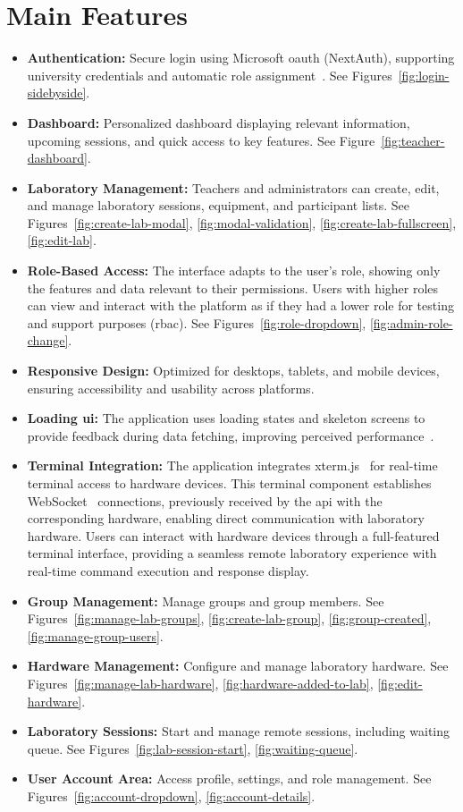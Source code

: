 \section{Main Features}
\begin{itemize}
    \item \textbf{Authentication:} Secure login using Microsoft \ac{oauth} (NextAuth), supporting university credentials and automatic role assignment~\cite{nextjs-authentication}. See Figures~\ref{fig:login-sidebyside}.
    \item \textbf{Dashboard:} Personalized dashboard displaying relevant information, upcoming sessions, and quick access to key features. See Figure~\ref{fig:teacher-dashboard}.
    \item \textbf{Laboratory Management:} Teachers and administrators can create, edit, and manage laboratory sessions, equipment, and participant lists. See Figures~\ref{fig:create-lab-modal}, \ref{fig:modal-validation}, \ref{fig:create-lab-fullscreen}, \ref{fig:edit-lab}.
    \item \textbf{Role-Based Access:} The interface adapts to the user's role, showing only the features and data relevant to their permissions. Users with higher roles can view and interact with the platform as if they had a lower role for testing and support purposes (\ac{rbac}). See Figures~\ref{fig:role-dropdown}, \ref{fig:admin-role-change}.
    \item \textbf{Responsive Design:} Optimized for desktops, tablets, and mobile devices, ensuring accessibility and usability across platforms.
    \item \textbf{Loading \ac{ui}:} The application uses loading states and skeleton screens to provide feedback during data fetching, improving perceived performance~\cite{nextjs-loading-ui}.
    \item \textbf{Terminal Integration:} The application integrates xterm.js~\cite{xtermjs} for real-time terminal access to hardware devices. This terminal component establishes WebSocket~\cite{websocket} connections, previously received by the \ac{api} with the corresponding hardware, enabling direct communication with laboratory hardware. Users can interact with hardware devices through a full-featured terminal interface, providing a seamless remote laboratory experience with real-time command execution and response display.
    \item \textbf{Group Management:} Manage groups and group members. See Figures~\ref{fig:manage-lab-groups}, \ref{fig:create-lab-group}, \ref{fig:group-created}, \ref{fig:manage-group-users}.
    \item \textbf{Hardware Management:} Configure and manage laboratory hardware. See Figures~\ref{fig:manage-lab-hardware}, \ref{fig:hardware-added-to-lab}, \ref{fig:edit-hardware}.
    \item \textbf{Laboratory Sessions:} Start and manage remote sessions, including waiting queue. See Figures~\ref{fig:lab-session-start}, \ref{fig:waiting-queue}.
    \item \textbf{User Account Area:} Access profile, settings, and role management. See Figures~\ref{fig:account-dropdown}, \ref{fig:account-details}.
\end{itemize}

